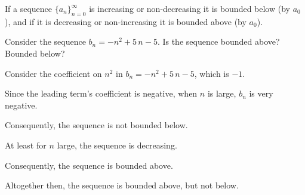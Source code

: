 \documentclass{ximera}
\newcommand{\ds}{\displaystyle}
\begin{document}
If a sequence $\ds
\{a_n\}_{n=0}^\infty$ is increasing or non-decreasing it is bounded
below (by $\ds a_0$), and if it is decreasing or non-increasing it is
bounded above (by $\ds a_0$).

\begin{question}
  Consider the sequence \(b_{n} = -n^{2} + 5 \, n - 5\).  Is the sequence bounded above?  Bounded below?

    \begin{hint}
      Consider the coefficient on \(n^{2}\) in \(b_{n} = -n^{2} + 5 \, n - 5\), which is \(-1\).
    \end{hint}
    \begin{hint}
      Since the leading term's coefficient is negative, when \(n\) is large, \(b_{n}\) is very negative.
    \end{hint}
    \begin{hint}
      Consequently, the sequence is not bounded below.
    \end{hint}
    \begin{hint}
      At least for \(n\) large, the sequence is decreasing.
    \end{hint}
    \begin{hint}
      Consequently, the sequence is bounded above.
    \end{hint}
    \begin{hint}
      Altogether then, the sequence is bounded above, but not below.
    \end{hint}

    \begin{multipleChoice}
    \end{multipleChoice}

\end{question}
            
\end{document}
